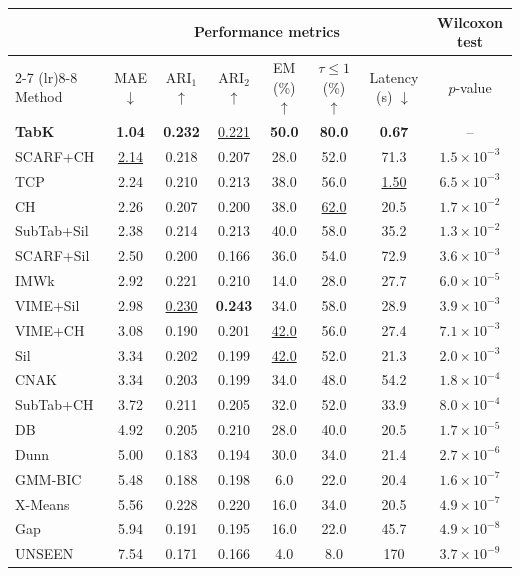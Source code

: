 \begin{tabular}{l c c c c c c c}
\toprule
& \multicolumn{6}{c}{\textbf{Performance metrics}} & \multicolumn{1}{c}{\textbf{Wilcoxon test}} \\
\cmidrule(lr){2-7} \cmidrule(lr){8-8}
Method & MAE $\downarrow$ & $\text{ARI}_{1}$ $\uparrow$ & $\text{ARI}_{2}$ $\uparrow$ & EM (\%) $\uparrow$ & $\tau \leq 1$ (\%) $\uparrow$ & Latency (s) $\downarrow$ & $p$-value \\
\midrule
\textbf{TabK} & \textbf{1.04} & \textbf{0.232} & \underline{0.221} & \textbf{50.0} & \textbf{80.0} & \textbf{0.67} & -- \\
SCARF+CH & \underline{2.14} & 0.218 & 0.207 & 28.0 & 52.0 & 71.3 & $1.5 \times 10^{-3}$ \\
TCP & 2.24 & 0.210 & 0.213 & 38.0 & 56.0 & \underline{1.50} & $6.5 \times 10^{-3}$ \\
CH & 2.26 & 0.207 & 0.200 & 38.0 & \underline{62.0} & 20.5 & $1.7 \times 10^{-2}$ \\
SubTab+Sil & 2.38 & 0.214 & 0.213 & 40.0 & 58.0 & 35.2 & $1.3 \times 10^{-2}$ \\
SCARF+Sil & 2.50 & 0.200 & 0.166 & 36.0 & 54.0 & 72.9 & $3.6 \times 10^{-3}$ \\
IMWk & 2.92 & 0.221 & 0.210 & 14.0 & 28.0 & 27.7 & $6.0 \times 10^{-5}$ \\
VIME+Sil & 2.98 & \underline{0.230} & \textbf{0.243} & 34.0 & 58.0 & 28.9 & $3.9 \times 10^{-3}$ \\
VIME+CH & 3.08 & 0.190 & 0.201 & \underline{42.0} & 56.0 & 27.4 & $7.1 \times 10^{-3}$ \\
Sil & 3.34 & 0.202 & 0.199 & \underline{42.0} & 52.0 & 21.3 & $2.0 \times 10^{-3}$ \\
CNAK & 3.34 & 0.203 & 0.199 & 34.0 & 48.0 & 54.2 & $1.8 \times 10^{-4}$ \\
SubTab+CH & 3.72 & 0.211 & 0.205 & 32.0 & 52.0 & 33.9 & $8.0 \times 10^{-4}$ \\
DB & 4.92 & 0.205 & 0.210 & 28.0 & 40.0 & 20.5 & $1.7 \times 10^{-5}$ \\
Dunn & 5.00 & 0.183 & 0.194 & 30.0 & 34.0 & 21.4 & $2.7 \times 10^{-6}$ \\
GMM-BIC & 5.48 & 0.188 & 0.198 & 6.0 & 22.0 & 20.4 & $1.6 \times 10^{-7}$ \\
X-Means & 5.56 & 0.228 & 0.220 & 16.0 & 34.0 & 20.5 & $4.9 \times 10^{-7}$ \\
Gap & 5.94 & 0.191 & 0.195 & 16.0 & 22.0 & 45.7 & $4.9 \times 10^{-8}$ \\
UNSEEN & 7.54 & 0.171 & 0.166 & 4.0 & 8.0 & 170 & $3.7 \times 10^{-9}$ \\
\bottomrule
\end{tabular}
